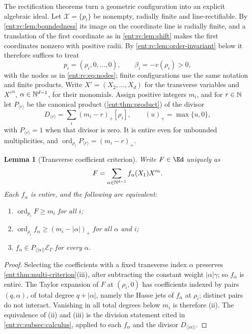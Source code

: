 \documentclass[11pt]{article}
\theoremstyle{plain}
\newtheorem{lemma}[lemma]{Lemma}
\theoremstyle{plain}
\theoremstyle{plain}
\theoremstyle{definition}
\theoremstyle{definition}
\theoremstyle{definition}
\theoremstyle{definition}
\theoremstyle{remark}
\newcommand{\E}{\mathcal E_\Gamma}
\DeclareMathOperator{\ord}{ord}\DeclareMathOperator{\cf}{cf}
\begin{document}
The rectification theorems turn a geometric configuration into an explicit
algebraic ideal. Let $\mathcal X=\{p_i\}$ be nonempty, radially finite and
line-rectifiable. By \cref{ent:rc:lem:boundedness} its image on the
coordinate line is radially finite, and a translation of the first coordinate
as in \cref{ent:rc:lem:shift} makes the first coordinates nonzero with
positive radii. By \cref{ent:rc:lem:order-invariant} below it therefore
suffices to treat
\begin{equation}\label{ent:rc:eq:line-D}
 p_i=(\rho_i,0,\ldots,0),\qquad\beta_i=-v(\rho_i)>0 ,
\end{equation}
with the nodes as in \eqref{ent:rc:eq:nodes}; finite configurations use the
same notation and finite products. Write $X'=(X_2,\ldots,X_d)$ for the
transverse variables and $X'^\alpha$, $\alpha\in\mathbb N^{d-1}$, for their
monomials. Assign positive integers $m_i$, and for $r\in\mathbb N$ let
$P_{\langle r\rangle}$ be the canonical product (\cref{ent:thm:product}) of
the divisor
\begin{equation}\label{ent:rc:eq:Pr}
 D_{\langle r\rangle}=\sum_i(m_i-r)_+[\rho_i],\qquad(u)_+=\max\{u,0\},
\end{equation}
with $P_{\langle r\rangle}=1$ when that divisor is zero. It is entire even
for unbounded multiplicities, and
$\ord_{\rho_i}P_{\langle r\rangle}=(m_i-r)_+$.

\begin{lemma}[Transverse coefficient criterion]\label{ent:rc:lem:transverse}
Write $F\in\Ed$ uniquely as
\[
 F=\sum_{\alpha\in\mathbb N^{d-1}}f_\alpha(X_1)X'^\alpha .
\]
Each $f_\alpha$ is entire, and the following are equivalent:
\begin{enumerate}[label=\textnormal{(\roman*)},leftmargin=2em]
\item $\ord_{p_i}F\ge m_i$ for all $i$;
\item $\ord_{\rho_i}f_\alpha\ge(m_i-|\alpha|)_+$ for all $\alpha$ and $i$;
\item $f_\alpha\in P_{\langle|\alpha|\rangle}\E$ for every $\alpha$.
\end{enumerate}
\end{lemma}
\begin{proof}
Selecting the coefficients with a fixed transverse index $\alpha$ preserves
\cref{ent:thm:multi-criterion}(iii), after subtracting the constant weight
$|\alpha|\gamma$; so $f_\alpha$ is entire. The Taylor expansion of $F$ at
$(\rho_i,0)$ has coefficients indexed by pairs $(q,\alpha)$, of total degree
$q+|\alpha|$, namely the Hasse jets of $f_\alpha$ at $\rho_i$; distinct pairs
do not interact. Vanishing in all total degrees below $m_i$ is therefore (ii).
The equivalence of (ii) and (iii) is the division statement cited in
\cref{ent:rc:subsec:calculus}, applied to each $f_\alpha$ and the divisor
$D_{\langle|\alpha|\rangle}$.
\end{proof}
\end{document}
